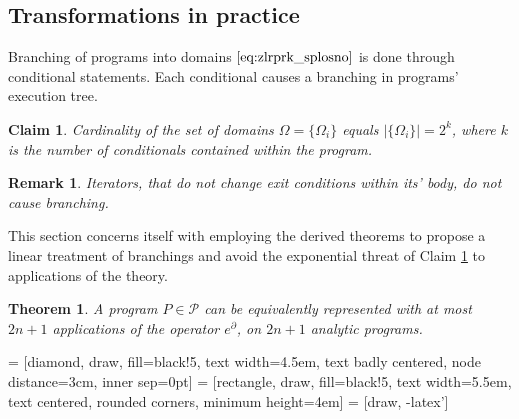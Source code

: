 \documentclass[smallcondensed]{svjour3}
\newcommand{\dP}{\mathcal{P}}
\newcommand{\D}{\partial}
\newtheorem{trditev}{Claim}[section]
\newtheorem{izrek}{Theorem}[section]
\newtheorem{opomba}{Remark}[section]
\begin{document}
\subsection{Transformations in practice} \label{sec:TransInPractice}

Branching of programs into domains $\eqref{eq:zlrprk_splosno}$ is done through conditional statements. Each conditional causes a branching in programs' execution tree.

\begin{trditev}\label{izr:st.zlepkov}
Cardinality of the set of domains $\Omega=\{\Omega_i\}$ equals $\lvert\{\Omega_i \}\rvert=2^k$, where $k$ is the number of conditionals contained within the program.
\end{trditev}
\begin{opomba}
Iterators, that do not change exit conditions within its' body, do not cause branching.
\end{opomba}

This section concerns itself with employing the derived theorems to propose a linear treatment of branchings and avoid the exponential threat of Claim \ref{izr:st.zlepkov} to applications of the theory.

\begin{izrek}
A program $P\in\dP$ can be equivalently represented with at most $2n+1$ applications of the operator $e^\D$, on $2n+1$ analytic programs.
\end{izrek}









 = [diamond, draw, fill=black!5, 
    text width=4.5em, text badly centered, node distance=3cm, inner sep=0pt]
 = [rectangle, draw, fill=black!5, 
    text width=5.5em, text centered, rounded corners, minimum height=4em]
 = [draw, -latex']
\end{document}

